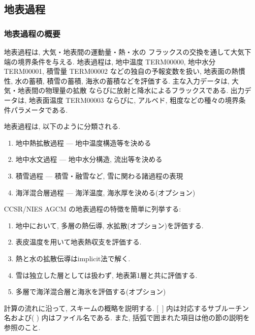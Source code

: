 ﻿
\subsection{地表過程}

\subsubsection{地表過程の概要}

地表過程は, 大気・地表間の運動量・熱・水の
フラックスの交換を通して大気下端の境界条件を与える.
地表過程は, 地中温度 TERM00000, 地中水分 TERM00001,
積雪量 TERM00002 などの独自の予報変数を扱い,
地表面の熱慣性, 水の蓄積, 積雪の蓄積, 
海氷の蓄積などを評価する.
主な入力データは, 大気・地表間の物理量の拡散
ならびに放射と降水によるフラックスである.
出力データは, 地表面温度 TERM00003 ならびに,
アルベド, 粗度などの種々の境界条件パラメータである.

地表過程は, 以下のように分類される.
\begin{enumerate}
  \item 地中熱拡散過程 --- 地中温度構造等を決める
  \item 地中水文過程   ---  地中水分構造, 流出等を決める
  \item 積雪過程        ---  積雪・融雪など, 雪に関わる諸過程の表現
  \item 海洋混合層過程 --- 海洋温度, 海氷厚を決める(オプション)
\end{enumerate}
      
CCSR/NIES AGCM の地表過程の特徴を簡単に列挙する:
\begin{enumerate}
\item 地中において, 多層の熱伝導, 水拡散(オプション)を評価する.
\item 表皮温度を用いて地表熱収支を評価する.
\item 熱と水の拡散伝導はimplicit法で解く.
\item 雪は独立した層としては扱わず, 地表第1層と共に評価する.
\item 多層で海洋混合層と海氷を評価する(オプション)
\end{enumerate}

計算の流れに沿って, スキームの概略を説明する.
[\ ] 内は対応するサブルーチン名および( ) 内はファイル名である.
また, 括弧で囲まれた項目は他の節の説明を参照のこと.

